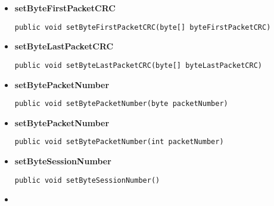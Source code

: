 {{{{{\begin{itemize}
{\hypertarget{filetransferUDP.FileTransfer.setByteFileNameLength(byte[])}{{\bf  setByteFileNameLength}\\}
\begin{lstlisting}[frame=none]
public void setByteFileNameLength(byte[] fileNameLength)\end{lstlisting} %
}%
\item{ 
\hypertarget{filetransferUDP.FileTransfer.setByteFirstPacketCRC(byte[])}{{\bf  setByteFirstPacketCRC}\\}
\begin{lstlisting}[frame=none]
public void setByteFirstPacketCRC(byte[] byteFirstPacketCRC)\end{lstlisting} %
}%
\item{ 
\hypertarget{filetransferUDP.FileTransfer.setByteLastPacketCRC(byte[])}{{\bf  setByteLastPacketCRC}\\}
\begin{lstlisting}[frame=none]
public void setByteLastPacketCRC(byte[] byteLastPacketCRC)\end{lstlisting} %
}%
\item{ 
\hypertarget{filetransferUDP.FileTransfer.setBytePacketNumber(byte)}{{\bf  setBytePacketNumber}\\}
\begin{lstlisting}[frame=none]
public void setBytePacketNumber(byte packetNumber)\end{lstlisting} %
}%
\item{ 
\hypertarget{filetransferUDP.FileTransfer.setBytePacketNumber(int)}{{\bf  setBytePacketNumber}\\}
\begin{lstlisting}[frame=none]
public void setBytePacketNumber(int packetNumber)\end{lstlisting} %
}%
\item{ 
\hypertarget{filetransferUDP.FileTransfer.setByteSessionNumber()}{{\bf  setByteSessionNumber}\\}
\begin{lstlisting}[frame=none]
public void setByteSessionNumber()\end{lstlisting} %
}%
\item{ 
}
\end{itemize}}}}}}

